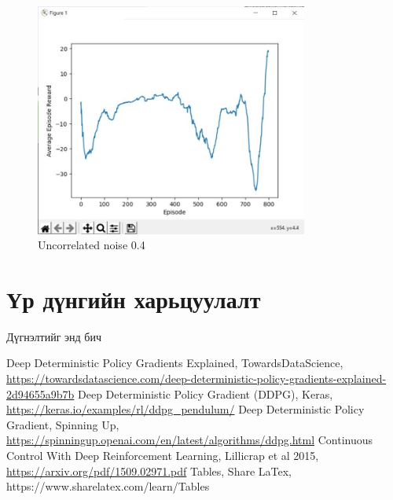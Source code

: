 \documentclass[12pt,A4]{report}
\begin{document}
\begin{figure}[H]
\centering
\includegraphics[width=0.8\textwidth]{./images/after_800_ep_04}
\caption{Uncorrelated noise 0.4}
\end{figure}

\section{Үр дүнгийн харьцуулалт}


Дүгнэлтийг энд бич


\singlespace
{}
\begin{thebibliography}{}
	Deep Deterministic Policy Gradients Explained, TowardsDataScience, \url{https://towardsdatascience.com/deep-deterministic-policy-gradients-explained-2d94655a9b7b}
	Deep Deterministic Policy Gradient (DDPG),  Keras, \url{https://keras.io/examples/rl/ddpg_pendulum/}
	Deep Deterministic Policy Gradient, Spinning Up, \url{https://spinningup.openai.com/en/latest/algorithms/ddpg.html}
	Continuous Control With Deep Reinforcement Learning, Lillicrap et al 2015, \url{https://arxiv.org/pdf/1509.02971.pdf}
    Tables, Share LaTex, https://www.sharelatex.com/learn/Tables
\end{thebibliography}
\end{document}
